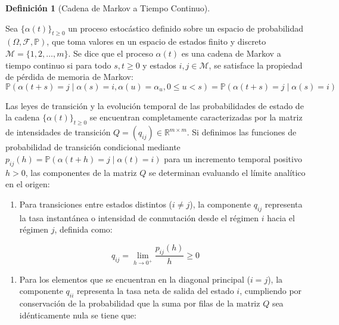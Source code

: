 \documentclass[
  spanish,
  letterpaper,
  DIV=11,
  numbers=noendperiod]{scrreprt}
\providecommand{\tightlist}{%
  \setlength{\itemsep}{0pt}\setlength{\parskip}{0pt}}
\theoremstyle{plain}
\theoremstyle{plain}
\theoremstyle{plain}
\theoremstyle{definition}
\newtheorem{definition}{Definición}[chapter]
\theoremstyle{remark}
\begin{document}
\begin{definition}[Cadena de Markov a Tiempo
Continuo]\protect\hypertarget{def-cadena-markov}{}\label{def-cadena-markov}

Sea \(\{\alpha(t)\}_{t \ge 0}\) un proceso estocástico definido sobre un
espacio de probabilidad \((\Omega, \mathcal{F}, \mathbb{P})\), que toma
valores en un espacio de estados finito y discreto
\(\mathcal{M} = \{1, 2, \dots, m\}\). Se dice que el proceso
\(\alpha(t)\) es una cadena de Markov a tiempo continuo si para todo
\(s, t \ge 0\) y estados \(i, j \in \mathcal{M}\), se satisface la
propiedad de pérdida de memoria de Markov: \[
\mathbb{P}(\alpha(t+s) = j \mid \alpha(s) = i, \alpha(u) = \alpha_u, 0 \le u < s) = \mathbb{P}(\alpha(t+s) = j \mid \alpha(s) = i)
\]

\end{definition}

Las leyes de transición y la evolución temporal de las probabilidades de
estado de la cadena \(\{\alpha(t)\}_{t \ge 0}\) se encuentran
completamente caracterizadas por la matriz de intensidades de transición
\(Q = (q_{ij}) \in \mathbb{R}^{m \times m}\). Si definimos las funciones
de probabilidad de transición condicional mediante
\(p_{ij}(h) = \mathbb{P}(\alpha(t+h) = j \mid \alpha(t) = i)\) para un
incremento temporal positivo \(h > 0\), las componentes de la matriz
\(Q\) se determinan evaluando el límite analítico en el origen:

\begin{enumerate}
\def\labelenumi{\arabic{enumi}.}
\tightlist
\item
  Para transiciones entre estados distintos (\(i \neq j\)), la
  componente \(q_{ij}\) representa la tasa instantánea o intensidad de
  conmutación desde el régimen \(i\) hacia el régimen \(j\), definida
  como:
\end{enumerate}

\[
q_{ij} = \lim_{h \to 0^+} \frac{p_{ij}(h)}{h} \ge 0
\]

\begin{enumerate}
\def\labelenumi{\arabic{enumi}.}
\setcounter{enumi}{1}
\tightlist
\item
  Para los elementos que se encuentran en la diagonal principal
  (\(i = j\)), la componente \(q_{ii}\) representa la tasa neta de
  salida del estado \(i\), cumpliendo por conservación de la
  probabilidad que la suma por filas de la matriz \(Q\) sea
  idénticamente nula se tiene que:
\end{enumerate}
\end{document}
